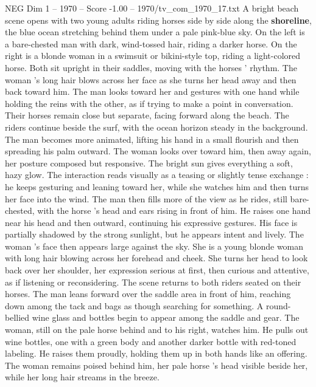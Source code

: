 \begin{textsample}{NEG Dim 1 – 1970 – Score -1.00 – 1970/tv\_com\_1970\_17.txt}  \label{ex:f1_neg_033}
A bright beach scene opens with two young adults riding horses side by side along the \textbf{shoreline}, the blue ocean stretching behind them under a pale pink-blue sky.
On the left is a bare-chested man with dark, wind-tossed hair, riding a darker horse.
On the right is a blonde woman in a swimsuit or bikini-style top, riding a light-colored horse.
Both sit upright in their saddles, moving with the horses ’ rhythm.
The woman ’s long hair blows across her face as she turns her head away and then back toward him.
The man looks toward her and gestures with one hand while holding the reins with the other, as if trying to make a point in conversation.
Their horses remain close but separate, facing forward along the beach.
The riders continue beside the surf, with the ocean horizon steady in the background.
The man becomes more animated, lifting his hand in a small flourish and then spreading his palm outward.
The woman looks over toward him, then away again, her posture composed but responsive.
The bright sun gives everything a soft, hazy glow.
The interaction reads visually as a teasing or slightly tense exchange : he keeps gesturing and leaning toward her, while she watches him and then turns her face into the wind.
The man then fills more of the view as he rides, still bare-chested, with the horse ’s head and ears rising in front of him.
He raises one hand near his head and then outward, continuing his expressive gestures.
His face is partially shadowed by the strong sunlight, but he appears intent and lively.
The woman ’s face then appears large against the sky.
She is a young blonde woman with long hair blowing across her forehead and cheek.
She turns her head to look back over her shoulder, her expression serious at first, then curious and attentive, as if listening or reconsidering.
The scene returns to both riders seated on their horses.
The man leans forward over the saddle area in front of him, reaching down among the tack and bags as though searching for something.
A round-bellied wine glass and bottles begin to appear among the saddle and gear.
The woman, still on the pale horse behind and to his right, watches him.
He pulls out wine bottles, one with a green body and another darker bottle with red-toned labeling.
He raises them proudly, holding them up in both hands like an offering.
The woman remains poised behind him, her pale horse ’s head visible beside her, while her long hair streams in the breeze.

\end{textsample}
